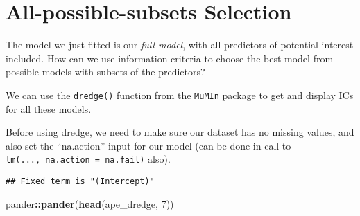 \documentclass[]{book}
\newenvironment{Shaded}{\begin{snugshade}}{\end{snugshade}}
\newcommand{\DataTypeTok}[1]{\textcolor[rgb]{0.13,0.29,0.53}{#1}}
\newcommand{\DecValTok}[1]{\textcolor[rgb]{0.00,0.00,0.81}{#1}}
\newcommand{\KeywordTok}[1]{\textcolor[rgb]{0.13,0.29,0.53}{\textbf{#1}}}
\newcommand{\NormalTok}[1]{#1}
\newcommand{\OperatorTok}[1]{\textcolor[rgb]{0.81,0.36,0.00}{\textbf{#1}}}
\newcommand{\StringTok}[1]{\textcolor[rgb]{0.31,0.60,0.02}{#1}}
\begin{document}
\hypertarget{all-possible-subsets-selection}{%
\section{All-possible-subsets Selection}\label{all-possible-subsets-selection}}

The model we just fitted is our \emph{full model}, with all predictors of potential interest included. How can we use information criteria to choose the best model from possible models with subsets of the predictors?

We can use the \texttt{dredge()} function from the \texttt{MuMIn} package to get and display ICs for all these models.

Before using dredge, we need to make sure our dataset has no missing values, and also set the ``na.action'' input for our model (can be done in call to \texttt{lm(...,\ na.action\ =\ \textquotesingle{}na.fail\textquotesingle{})} also).

\begin{Shaded}
\end{Shaded}

\begin{verbatim}
## Fixed term is "(Intercept)"
\end{verbatim}

\begin{Shaded}
\begin{Highlighting}[]
\NormalTok{pander}\OperatorTok{::}\KeywordTok{pander}\NormalTok{(}\KeywordTok{head}\NormalTok{(ape_dredge, }\DecValTok{7}\NormalTok{))}
\end{Highlighting}
\end{Shaded}
\end{document}

